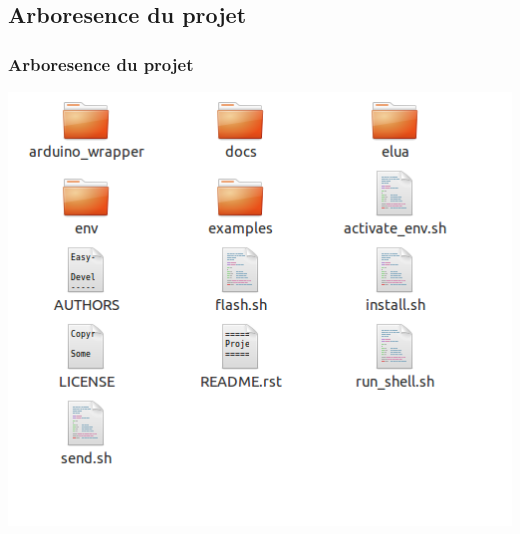 \documentclass{beamer}
\begin{document}
\subsection{Arboresence du projet}
\begin{frame}
\frametitle{Arboresence du projet}
\begin{center}
 \includegraphics[scale=0.5]{../images/root_dir_project.png}
\end{center}
\end{frame}
\end{document}
